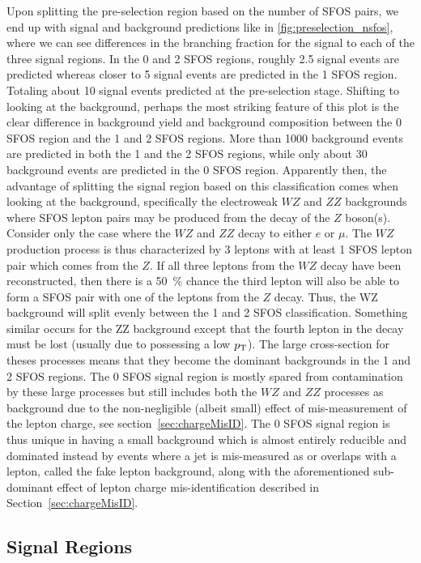 Upon splitting the pre-selection region based on the number of SFOS
pairs, we end up with signal and background predictions like in 
\fig\ref{fig:preselection_nsfos}, where we can see differences
in the branching fraction for the signal to each of the three signal regions.
In the 0 and 2 SFOS regions, roughly 2.5 signal events are predicted
whereas closer to 5 signal events are predicted in the 1 SFOS region. 
Totaling about 10 signal events predicted at the pre-selection stage.
Shifting to looking at the background, perhaps the most striking 
feature of this plot is the 
clear difference in background yield and background composition
between the 0 SFOS region and the 1 and 2 SFOS regions.
More than 1000 background events are predicted in both the 1 and
the 2 SFOS regions, while only about 30 background events are
predicted in the 0 SFOS region.
Apparently then, the advantage of splitting the signal region based on this
classification comes when looking at the background, specifically the
electroweak $WZ$ and $ZZ$ backgrounds where SFOS lepton pairs may be
produced from the decay of the $Z$ boson(s). Consider only the case
where the $WZ$ and $ZZ$ decay to either $e$ or $\mu$.  The $WZ$ production
process is thus characterized by 3 leptons with at least 1 SFOS lepton pair
which comes from the $Z$. If all three leptons from the $WZ$ decay have been
reconstructed, then there is a 50~\% chance the third lepton 
will also be able to form a SFOS pair with one of the leptons from the $Z$ decay.
Thus, the WZ background will split evenly between the 1 and 2 SFOS classification.
Something similar occurs for the ZZ background except that the fourth lepton 
in the decay must be lost (usually due to possessing a low $p_{\mathrm{T}}$).
The large cross-section for theses processes means that
they become the dominant backgrounds in the 1 and 2 SFOS regions.  
The 0 SFOS signal region is mostly spared from contamination  by 
these large processes but still
includes both the $WZ$ and $ZZ$ processes as background due to the
non-negligible (albeit small) effect of mis-measurement of the lepton
charge, see section~\ref{sec:chargeMisID}.  The 0 SFOS signal region
is thus unique in having a small background which is almost entirely
reducible and dominated instead by events where a jet is mis-measured
as or overlaps with a lepton, called the fake lepton background, along
with the aforementioned sub-dominant effect of lepton charge 
mis-identification described in Section~\ref{sec:chargeMisID}.  

\subsection{Signal Regions}
